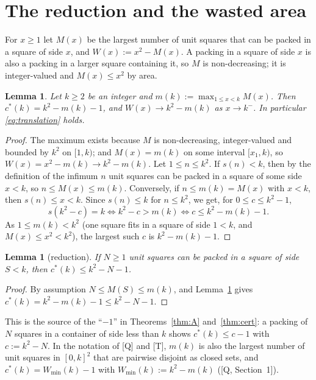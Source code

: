 \documentclass[11pt]{amsart}
\newcommand{\cs}{c^{*}}
\newcommand{\Wmin}{W_{\min}}
\newtheorem{lemma}[theorem]{Lemma}
\theoremstyle{definition}
\theoremstyle{remark}
\numberwithin{equation}{section}
\begin{document}
\section{The reduction and the wasted area}\label{sec:prelim}

For $x\ge1$ let $M(x)$ be the largest number of unit squares that can be packed in a square of side $x$, and
$W(x):=x^2-M(x)$. A packing in a square of side $x$ is also a packing in a larger square containing it, so $M$ is
non-decreasing; it is integer-valued and $M(x)\le x^2$ by area.

\begin{lemma}\label{lem:translation}
Let $k\ge2$ be an integer and $m(k):=\max_{1\le x<k}M(x)$. Then $\cs(k)=k^2-m(k)-1$, and $W(x)\to k^2-m(k)$ as
$x\to k^-$. In particular \eqref{eq:translation} holds.
\end{lemma}

\begin{proof}
The maximum exists because $M$ is non-decreasing, integer-valued and bounded by $k^2$ on $[1,k)$; and $M(x)=m(k)$ on
some interval $[x_1,k)$, so $W(x)=x^2-m(k)\to k^2-m(k)$. Let $1\le n\le k^2$. If $s(n)<k$, then by the definition of the
infimum $n$ unit squares can be packed in a square of some side $x<k$, so $n\le M(x)\le m(k)$. Conversely, if $n\le
m(k)=M(x)$ with $x<k$, then $s(n)\le x<k$. Since $s(n)\le k$ for $n\le k^2$, we get, for $0\le c\le k^2-1$,
\[
s(k^2-c)=k\iff k^2-c>m(k)\iff c\le k^2-m(k)-1 .
\]
As $1\le m(k)<k^2$ (one square fits in a square of side $1<k$, and $M(x)\le x^2<k^2$), the largest such $c$ is
$k^2-m(k)-1$.
\end{proof}

\begin{lemma}[reduction]\label{lem:reduction}
If $N\ge1$ unit squares can be packed in a square of side $S<k$, then $\cs(k)\le k^2-N-1$.
\end{lemma}

\begin{proof}
By assumption $N\le M(S)\le m(k)$, and Lemma~\ref{lem:translation} gives $\cs(k)=k^2-m(k)-1\le k^2-N-1$.
\end{proof}

This is the source of the ``$-1$'' in Theorems~\ref{thm:A} and~\ref{thm:cert}: a packing of $N$ squares in a container of
side less than $k$ shows $\cs(k)\le c-1$ with $c:=k^2-N$. In the notation of [Q] and [T], $m(k)$ is also the largest
number of unit squares in $[0,k]^2$ that are pairwise disjoint as closed sets, and $\cs(k)=\Wmin(k)-1$ with
$\Wmin(k):=k^2-m(k)$ ([Q, Section~1]).
\end{document}
